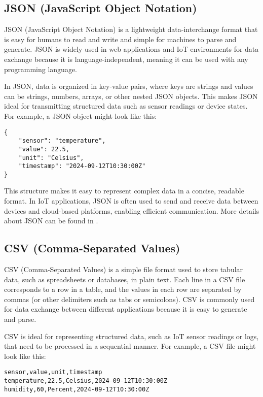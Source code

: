 \subsection*{JSON (JavaScript Object Notation)}
\label{sec:json-format}
JSON (JavaScript Object Notation) is a lightweight data-interchange format that is easy for humans to read and write and simple for machines to parse and generate. JSON is widely used in web applications and IoT environments for data exchange because it is language-independent, meaning it can be used with any programming language.

In JSON, data is organized in key-value pairs, where keys are strings and values can be strings, numbers, arrays, or other nested JSON objects. This makes JSON ideal for transmitting structured data such as sensor readings or device states. For example, a JSON object might look like this:

\begin{verbatim}
{
    "sensor": "temperature",
    "value": 22.5,
    "unit": "Celsius",
    "timestamp": "2024-09-12T10:30:00Z"
}
\end{verbatim}

This structure makes it easy to represent complex data in a concise, readable format. In IoT applications, JSON is often used to send and receive data between devices and cloud-based platforms, enabling efficient communication. More details about JSON can be found in \cite{site:json-docs}.

\subsection*{CSV (Comma-Separated Values)}
\label{sec:csv-format}
CSV (Comma-Separated Values) is a simple file format used to store tabular data, such as spreadsheets or databases, in plain text. Each line in a CSV file corresponds to a row in a table, and the values in each row are separated by commas (or other delimiters such as tabs or semicolons). CSV is commonly used for data exchange between different applications because it is easy to generate and parse.

CSV is ideal for representing structured data, such as IoT sensor readings or logs, that need to be processed in a sequential manner. For example, a CSV file might look like this:

\begin{verbatim}
sensor,value,unit,timestamp
temperature,22.5,Celsius,2024-09-12T10:30:00Z
humidity,60,Percent,2024-09-12T10:30:00Z
\end{verbatim}

